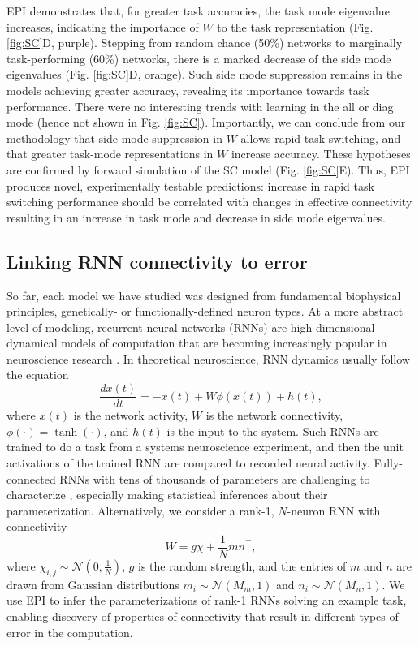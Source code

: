 \documentclass[11pt]{article}
\begin{document}
EPI demonstrates that, for greater task accuracies, the task mode eigenvalue increases, indicating the importance of $W$ to the task representation (Fig. \ref{fig:SC}D, purple).  Stepping from random chance (50\%) networks to marginally task-performing (60\%) networks, there is a marked decrease of the side mode eigenvalues (Fig. \ref{fig:SC}D, orange).  Such side mode suppression remains in the models achieving greater accuracy, revealing its importance towards task performance.   There were no interesting trends with learning in the all or diag mode (hence not shown in Fig. \ref{fig:SC}). Importantly, we can conclude from our methodology that side mode suppression in $W$ allows rapid task switching, and that greater task-mode representations in $W$ increase accuracy.  These hypotheses are confirmed by forward simulation of the SC model (Fig. \ref{fig:SC}E).  Thus, EPI produces novel, experimentally testable predictions: increase in rapid task switching performance should be correlated with changes in effective connectivity resulting in an increase in task mode and decrease in side mode eigenvalues.

\subsection{Linking RNN connectivity to error} \label{results_RNN}
So far, each model we have studied was designed from fundamental biophysical principles, genetically- or functionally-defined neuron types.  
At a more abstract level of modeling, recurrent neural networks (RNNs) are high-dimensional dynamical models of computation that are becoming increasingly popular in neuroscience research \cite{barak2017recurrent}. 
In theoretical neuroscience, RNN dynamics usually follow the equation
\begin{equation}
\frac{dx(t)}{dt} = -x(t) + W \phi(x(t)) + h(t),
\end{equation}
where $x(t)$ is the network activity, $W$ is the network connectivity, $\phi(\cdot) = \tanh(\cdot)$, and $h(t)$ is the input to the system.
Such RNNs are trained to do a task from a systems neuroscience experiment, and then the unit activations of the trained RNN are compared to recorded neural activity.
Fully-connected RNNs with tens of thousands of parameters are challenging to characterize \cite{sussillo2013opening}, especially making statistical inferences about their parameterization.
Alternatively, we consider a rank-1, $N$-neuron RNN with connectivity
\begin{equation}
W = g\chi + \frac{1}{N}mn^\top,
\end{equation}
where $\chi_{i,j} \sim \mathcal{N}(0, \frac{1}{N})$, $g$ is the random strength, and the entries of $m$ and $n$ are drawn from Gaussian distributions $m_i \sim \mathcal{N}(M_m, 1)$ and $n_i \sim \mathcal{N}(M_n, 1)$.  
We use EPI to infer the parameterizations of rank-1 RNNs solving an example task, enabling discovery of properties of connectivity that result in different types of error in the computation.
\end{document}
